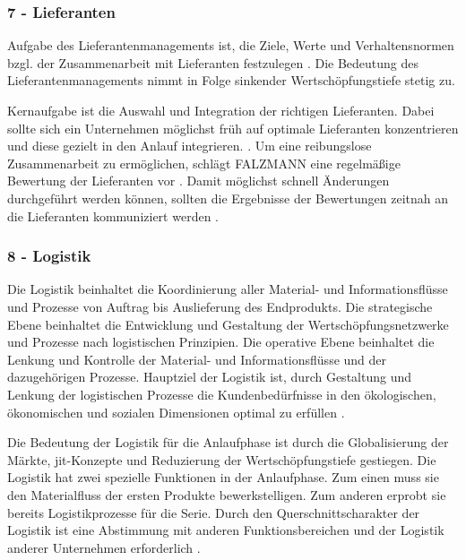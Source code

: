 \subsubsection*{7 - Lieferanten}
Aufgabe des Lieferantenmanagements ist, die Ziele, Werte und Verhaltensnormen bzgl. der Zusammenarbeit mit Lieferanten festzulegen \cite{Schuh2008}. 
Die Bedeutung des Lieferantenmanagements nimmt in Folge sinkender Wertschöpfungstiefe stetig zu. 

Kernaufgabe ist die Auswahl und Integration der richtigen Lieferanten. Dabei sollte sich ein Unternehmen möglichst früh auf optimale Lieferanten konzentrieren und diese gezielt in den Anlauf integrieren. \cite{Schuh2008}.  
Um eine reibungslose Zusammenarbeit zu ermöglichen, schlägt FALZMANN eine regelmäßige Bewertung der Lieferanten vor \cite{Falzmann2007}. Damit möglichst schnell Änderungen durchgeführt werden können, sollten die Ergebnisse der Bewertungen zeitnah an die Lieferanten kommuniziert werden \cite[70]{Hofbauer2016}. 

\subsubsection*{8 - Logistik}

Die Logistik beinhaltet die Koordinierung aller Material- und Informationsflüsse und Prozesse von Auftrag bis Auslieferung des Endprodukts. Die strategische Ebene beinhaltet die Entwicklung und Gestaltung der Wertschöpfungsnetzwerke und Prozesse nach logistischen Prinzipien. Die operative Ebene beinhaltet die Lenkung und Kontrolle der Material- und Informationsflüsse und der dazugehörigen Prozesse. 
Hauptziel der Logistik ist, durch Gestaltung und Lenkung der logistischen Prozesse die Kundenbedürfnisse in den ökologischen, ökonomischen und sozialen Dimensionen optimal zu erfüllen \cite[28]{Schmitt2015}. 

Die Bedeutung der Logistik für die Anlaufphase ist durch die Globalisierung der Märkte, \gls{jit}-Konzepte und Reduzierung der 
Wertschöpfungstiefe gestiegen. Die Logistik hat zwei spezielle Funktionen in der Anlaufphase. Zum einen muss sie den Materialfluss der ersten Produkte bewerkstelligen. Zum anderen erprobt sie bereits Logistikprozesse für die Serie.
Durch den Querschnittscharakter der Logistik ist eine Abstimmung mit anderen Funktionsbereichen und der Logistik anderer Unternehmen erforderlich \cite[1189]{Pfohl2000}.

